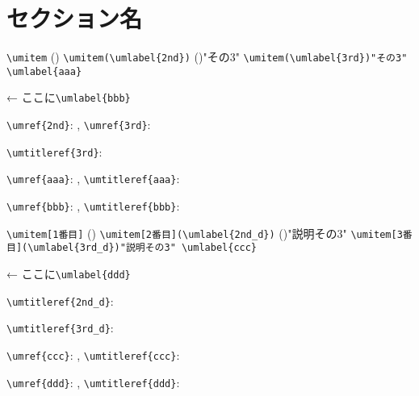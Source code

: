 \documentclass{ltjsarticle}
\begin{document}
\setcounter{section}{41}
\section{セクション名}

\begin{enumerate}
  \umitem \verb|\umitem|
  \umitem()
    \verb|\umitem(\umlabel{2nd})|
  \umitem()"その3"
    \verb|\umitem(\umlabel{3rd})"その3" \umlabel{aaa}|
\end{enumerate}

← ここに\verb|\umlabel{bbb}|

\verb|\umref{2nd}|: , \verb|\umref{3rd}|: 

\verb|\umtitleref{3rd}|: 

\verb|\umref{aaa}|: , \verb|\umtitleref{aaa}|: 

\verb|\umref{bbb}|: , \verb|\umtitleref{bbb}|: 

\begin{description}
  \umitem[1番目] \verb|\umitem[1番目]|
  \umitem[2番目]()
    \verb|\umitem[2番目](\umlabel{2nd_d})|
  \umitem[3番目]()"説明その3"
    \verb|\umitem[3番目](\umlabel{3rd_d})"説明その3" \umlabel{ccc}|
\end{description}

← ここに\verb|\umlabel{ddd}|

\verb|\umtitleref{2nd_d}|: 

\verb|\umtitleref{3rd_d}|: 

\verb|\umref{ccc}|: , \verb|\umtitleref{ccc}|: 

\verb|\umref{ddd}|: , \verb|\umtitleref{ddd}|: 
\end{document}
